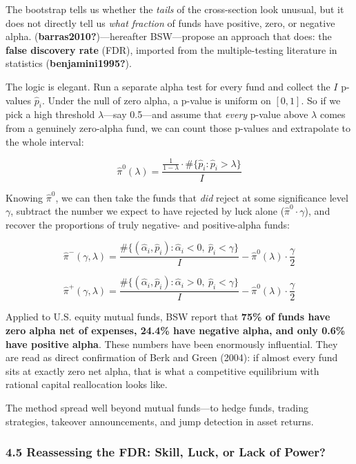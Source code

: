 \documentclass[
  letterpaper,
  DIV=11,
  numbers=noendperiod]{scrartcl}
\begin{document}
The bootstrap tells us whether the \emph{tails} of the cross-section
look unusual, but it does not directly tell us \emph{what fraction} of
funds have positive, zero, or negative alpha.
(\textbf{barras2010?})---hereafter BSW---propose an approach that does:
the \textbf{false discovery rate} (FDR), imported from the
multiple-testing literature in statistics (\textbf{benjamini1995?}).

The logic is elegant. Run a separate alpha test for every fund and
collect the \(I\) p-values \(\hat{p}_i\). Under the null of zero alpha,
a p-value is uniform on \([0,1]\). So if we pick a high threshold
\(\lambda\)---say 0.5---and assume that \emph{every} p-value above
\(\lambda\) comes from a genuinely zero-alpha fund, we can count those
p-values and extrapolate to the whole interval:

\[\hat{\pi}^0(\lambda) = \frac{\frac{1}{1-\lambda} \cdot \#\{\hat{p}_i : \hat{p}_i > \lambda\}}{I} \tag{2}\]

Knowing \(\hat{\pi}^0\), we can then take the funds that \emph{did}
reject at some significance level \(\gamma\), subtract the number we
expect to have rejected by luck alone (\(\hat{\pi}^0 \cdot \gamma\)),
and recover the proportions of truly negative- and positive-alpha funds:

\[\hat{\pi}^-(\gamma,\lambda) = \frac{\#\{(\hat{\alpha}_i,\hat{p}_i) : \hat{\alpha}_i < 0,\ \hat{p}_i < \gamma\}}{I} - \hat{\pi}^0(\lambda)\cdot\frac{\gamma}{2} \tag{3a}\]

\[\hat{\pi}^+(\gamma,\lambda) = \frac{\#\{(\hat{\alpha}_i,\hat{p}_i) : \hat{\alpha}_i > 0,\ \hat{p}_i < \gamma\}}{I} - \hat{\pi}^0(\lambda)\cdot\frac{\gamma}{2} \tag{3b}\]

Applied to U.S. equity mutual funds, BSW report that \textbf{75\% of
funds have zero alpha net of expenses, 24.4\% have negative alpha, and
only 0.6\% have positive alpha}. These numbers have been enormously
influential. They are read as direct confirmation of Berk and Green
(2004): if almost every fund sits at exactly zero net alpha, that is
what a competitive equilibrium with rational capital reallocation looks
like.

The method spread well beyond mutual funds---to hedge funds, trading
strategies, takeover announcements, and jump detection in asset returns.

\subsubsection{4.5 Reassessing the FDR: Skill, Luck, or Lack of
Power?}\label{reassessing-the-fdr-skill-luck-or-lack-of-power}
\end{document}
